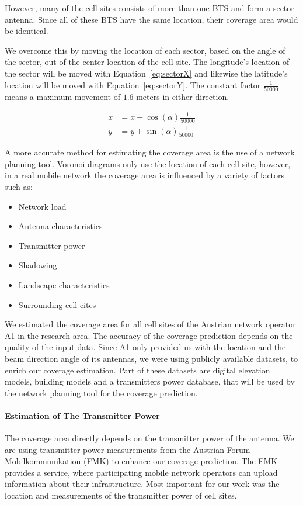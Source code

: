However, many of the cell sites consists of more than one BTS and form a sector antenna. Since all of these BTS have the same location, their coverage area would be identical.

We overcome this by moving the location of each sector, based on the angle of the sector, out of the center location of the cell site. The longitude's location of the sector will be moved with Equation~\ref{eq:sectorX} and likewise the latitude's location will be moved with Equation~\ref{eq:sectorY}. The constant factor $\frac{1}{50000}$ means a maximum movement of $1.6$ meters in either direction.

\begin{align}
	x & =x+\cos(\alpha)\frac{1}{50000}\label{eq:sectorX}  \\
	y & =y+\sin(\alpha)\frac{1}{50000} \label{eq:sectorY} 
\end{align}
\newline

A more accurate method for estimating the coverage area is the use of a network planning tool. Voronoi diagrams only use the location of each cell site, however, in a real mobile network the coverage area is influenced by a variety of factors such as:
\begin{itemize}
	\item Network load
	\item Antenna characteristics
	\item Transmitter power
	\item Shadowing
	\item Landscape characteristics
	\item Surrounding cell cites
\end{itemize}

We estimated the coverage area for all cell sites of the Austrian network operator A1 in the research area. The accuracy of the coverage prediction depends on the quality of the input data. Since A1 only provided us with the location and the beam direction angle of its antennas, we were using publicly available datasets, to enrich our coverage estimation. Part of these datasets are digital elevation models, building models and a transmitters power database, that will be used by the network planning tool for the coverage prediction.

\paragraph{Estimation of The Transmitter Power}
The coverage area directly depends on the transmitter power of the antenna. We are using transmitter power measurements from the Austrian Forum Mobilkommunikation (FMK) to enhance our coverage prediction. The FMK provides a service, where participating mobile network operators can upload information about their infrastructure. Most important for our work was the location and measurements of the transmitter power of cell sites.

